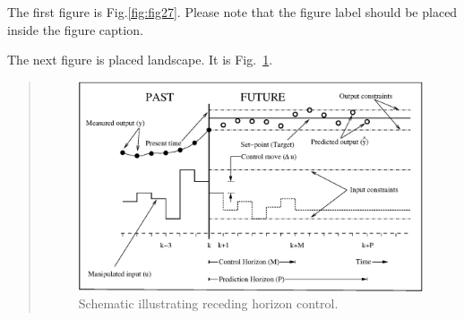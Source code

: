 The first figure is Fig.\ref{fig:fig27}.   Please note that the figure label should be placed inside the figure caption.  
\newpage

The next figure is placed landscape.  It is Fig.~\ref{fig:mpc}.

\begin{landscape}
\renewcommand{\baselinestretch}{1}
\small\normalsize
\begin{quote}
\begin{figure}
\begin{center}
\includegraphics[width=8.2in]{mpc.eps}
\end{center}
\caption{Schematic illustrating receding horizon control.
\label{fig:mpc} }
\end{figure}
\end{quote}
\renewcommand{\baselinestretch}{2}
\small\normalsize
\end{landscape}

